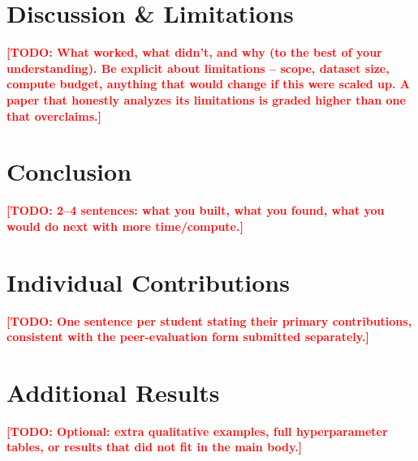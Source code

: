 \documentclass[11pt]{article}
\newcommand{\todo}[1]{\textcolor{red}{\textbf{[TODO: #1]}}}
\begin{document}
\section{Discussion \& Limitations}
\label{sec:discussion}
\todo{What worked, what didn't, and why (to the best of your understanding). Be
explicit about limitations -- scope, dataset size, compute budget, anything that would
change if this were scaled up. A paper that honestly analyzes its limitations is
graded higher than one that overclaims.}

\section{Conclusion}
\label{sec:conclusion}
\todo{2--4 sentences: what you built, what you found, what you would do next with more
time/compute.}

\section*{Individual Contributions}
\label{sec:contributions}
\todo{One sentence per student stating their primary contributions, consistent with
the peer-evaluation form submitted separately.}




\appendix
\section{Additional Results}
\label{sec:appendix}
\todo{Optional: extra qualitative examples, full hyperparameter tables, or results
that did not fit in the main body.}
\end{document}
